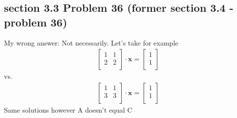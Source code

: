 \documentclass[a4paper,11pt]{article}
\newcommand{\mybf}[1]{\boldsymbol{#1}}
\begin{document}
\subsection*{section 3.3 Problem 36 (former section 3.4 - problem 36)}
My wrong answer:
Not necessarily. Let's take for example
\begin{align}
\begin{bmatrix}
1 & 1 \\
2 & 2 \\
\end{bmatrix}
\cdot \mybf{x} =
\begin{bmatrix}
1 \\
1 \\
\end{bmatrix}
\end{align}
vs.
\begin{align}
\begin{bmatrix}
1 & 1 \\
3 & 3 \\
\end{bmatrix}
\cdot \mybf{x} =
\begin{bmatrix}
1 \\
1 \\
\end{bmatrix}
\end{align}
Same solutions however A doesn't equal C
\end{document}
